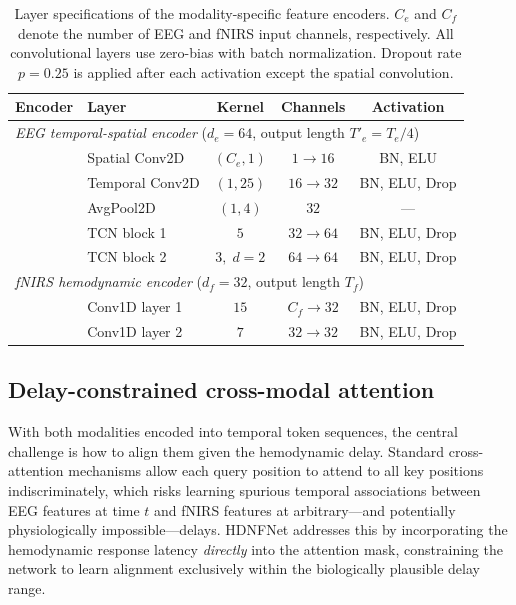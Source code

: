 \documentclass[preprint,12pt,authoryear]{elsarticle}
\begin{document}
\begin{table}[t]
\centering
\caption{Layer specifications of the modality-specific feature encoders. $C_e$ and $C_f$ denote the number of EEG and fNIRS input channels, respectively. All convolutional layers use zero-bias with batch normalization. Dropout rate $p = 0.25$ is applied after each activation except the spatial convolution.}
\label{tab:encoder}
\small
\begin{tabular}{llccc}
\hline
Encoder & Layer & Kernel & Channels & Activation \\
\hline
\multicolumn{5}{l}{\textit{EEG temporal-spatial encoder} ($d_e = 64$, output length $T'_e = T_e/4$)} \\
 & Spatial Conv2D   & $(C_e, 1)$ & $1 \to 16$   & BN, ELU \\
 & Temporal Conv2D  & $(1, 25)$  & $16 \to 32$  & BN, ELU, Drop \\
 & AvgPool2D        & $(1, 4)$   & $32$         & --- \\
 & TCN block 1      & $5$        & $32 \to 64$  & BN, ELU, Drop \\
 & TCN block 2      & $3,\; d{=}2$ & $64 \to 64$ & BN, ELU, Drop \\
\hline
\multicolumn{5}{l}{\textit{fNIRS hemodynamic encoder} ($d_f = 32$, output length $T_f$)} \\
 & Conv1D layer 1   & $15$       & $C_f \to 32$ & BN, ELU, Drop \\
 & Conv1D layer 2   & $7$        & $32 \to 32$  & BN, ELU, Drop \\
\hline
\end{tabular}
\end{table}


\subsection{Delay-constrained cross-modal attention}
\label{sec:delay_attention}

With both modalities encoded into temporal token sequences, the central challenge is how to align them given the hemodynamic delay. Standard cross-attention mechanisms \citep{vaswani2017attention} allow each query position to attend to all key positions indiscriminately, which risks learning spurious temporal associations between EEG features at time $t$ and fNIRS features at arbitrary---and potentially physiologically impossible---delays. HDNFNet addresses this by incorporating the hemodynamic response latency \textit{directly} into the attention mask, constraining the network to learn alignment exclusively within the biologically plausible delay range.
\end{document}

